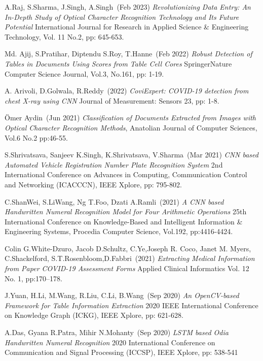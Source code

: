 \begin{thebibliography}{999}

A.Raj, S.Sharma, J.Singh, A.Singh~(Feb 2023) 
{\it Revolutionizing Data Entry: An In-Depth Study of Optical Character Recognition Technology and Its Future Potential} International Journal for Research in Applied Science \& Engineering Technology, Vol. 11 No.2, pp: 645-653.

Md. Ajij, S.Pratihar, Diptendu S.Roy, T.Hanne~(Feb 2022)
{\it Robust Detection of Tables in Documents Using Scores from Table Cell Cores}
SpringerNature Computer Science Journal, Vol.3, No.161, pp: 1-19.

A. Arivoli, D.Golwala, R.Reddy~(2022)
{\it CoviExpert: COVID-19 detection from chest X-ray using CNN} 
Journal of Measurement: Sensors 23, pp: 1-8.

Ömer Aydin~(Jun 2021) 
{\it Classification of Documents Extracted from Images with Optical Character Recognition Methods}, 
Anatolian Journal of Computer Sciences, Vol.6 No.2 pp:46-55.


S.Shrivatsava, Sanjeev K.Singh, K.Shrivatsava, V.Sharma~(Mar 2021)
{\it CNN based Automated Vehicle Registration Number Plate Recognition System} 
2nd International Conference on Advances in Computing, Communication Control and Networking (ICACCCN), IEEE Xplore, pp: 795-802.

C.ShanWei, S.LiWang, Ng T.Foo, Dzati A.Ramli~(2021)
{\it A CNN based Handwritten Numeral Recognition Model for Four Arithmetic Operations}
25th International Conference on Knowledge-Based and Intelligent Information \& Engineering
Systems, Procedia Computer Science, Vol.192, pp:4416-4424.

Colin G.White-Dzuro, Jacob D.Schultz, C.Ye,Joseph R. Coco, Janet M. Myers, C.Shackelford, S.T.Rosenbloom,D.Fabbri~(2021)
{\it Extracting Medical Information from Paper COVID-19 Assessment Forms} 
Applied Clinical Informatics Vol. 12 No. 1, pp:170–178.

J.Yuan, H.Li, M.Wang, R.Liu, C.Li, B.Wang~(Sep 2020)
{\it An OpenCV-based Framework for Table Information Extraction}
2020 IEEE International Conference on Knowledge Graph (ICKG), IEEE Xplore, pp: 621-628.

A.Das, Gyana R.Patra, Mihir N.Mohanty~(Sep 2020)
{\it LSTM based Odia Handwritten Numeral Recognition} 
2020 International Conference on Communication and Signal Processing (ICCSP), IEEE Xplore, pp: 538-541


\end{thebibliography}
